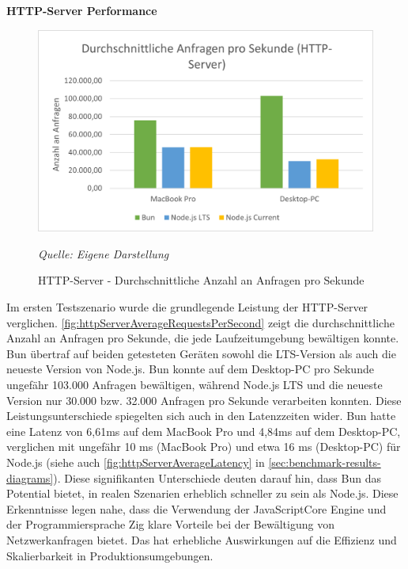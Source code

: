 \noindent
\textbf{HTTP-Server Performance}
\begin{figure}[h!]
	\centering
	\includegraphics[width=\linewidth]{./images/httpServerAverageRequestsPerSecond.png}
	\caption{HTTP-Server - Durchschnittliche Anzahl an Anfragen pro Sekunde}
	\label{fig:httpServerAverageRequestsPerSecond}
	\textit{Quelle: Eigene Darstellung}
\end{figure}


\noindent
Im ersten Testszenario wurde die grundlegende Leistung der HTTP-Server verglichen. \autoref{fig:httpServerAverageRequestsPerSecond} zeigt die durchschnittliche Anzahl an Anfragen pro Sekunde, die jede Laufzeitumgebung bewältigen konnte. Bun übertraf auf beiden getesteten Geräten sowohl die LTS-Version als auch die neueste Version von Node.js. Bun konnte auf dem Desktop-PC pro Sekunde ungefähr 103.000 Anfragen bewältigen, während Node.js LTS und die neueste Version nur 30.000 bzw. 32.000 Anfragen pro Sekunde verarbeiten konnten. Diese Leistungsunterschiede spiegelten sich auch in den Latenzzeiten wider. Bun hatte eine Latenz von 6,61ms auf dem MacBook Pro und 4,84ms auf dem Desktop-PC, verglichen mit ungefähr 10 ms (MacBook Pro) und etwa 16 ms (Desktop-PC) für Node.js (siehe auch \autoref{fig:httpServerAverageLatency} in \autoref{sec:benchmark-results-diagrams}).\newline
Diese signifikanten Unterschiede deuten darauf hin, dass Bun das Potential bietet, in realen Szenarien erheblich schneller zu sein als Node.js. Diese Erkenntnisse legen nahe, dass die Verwendung der JavaScriptCore Engine und der Programmiersprache Zig klare Vorteile bei der Bewältigung von Netzwerkanfragen bietet. Das hat erhebliche Auswirkungen auf die Effizienz und Skalierbarkeit in Produktionsumgebungen.\\

